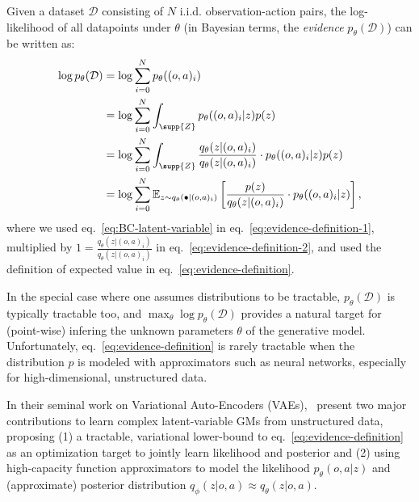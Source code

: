 Given a dataset \( \mathcal D \) consisting of \( N \) i.i.d. observation-action pairs, the log-likelihood of all datapoints under \( \theta \) (in Bayesian terms, the \emph{evidence} \( p_\theta(\mathcal D)\)) can be written as:
\begin{align}
    \log p_\theta(\mathcal D) &= \log \sum_{i=0}^N p_\theta ((o,a)_i) \label{eq:evidence-definition-1}\\
                              &= \log \sum_{i=0}^N \int_{\supp{Z}} p_\theta((o,a)_i \vert z) p(z) \label{eq:evidence-definition-2}\\
                              &= \log \sum_{i=0}^N \int_{\supp{Z}} \frac{q_\theta(z \vert (o,a)_i)}{q_\theta(z \vert (o,a)_i)} \cdot p_\theta((o,a)_i \vert z) p(z) \label{eq:evidence-definition-3}\\
                              &= \log \sum_{i=0}^N \mathbb E_{z \sim q_\theta(\bullet \vert (o,a)_i)} \left[ \frac{p(z)}{q_\theta(z \vert (o,a)_i)} \cdot p_\theta((o,a)_i \vert z) \right], \label{eq:evidence-definition}
\end{align}
where we used eq.~\ref{eq:BC-latent-variable} in eq.~\ref{eq:evidence-definition-1}, multiplied by \(1 = \frac{q_\theta(z \vert (o,a)_i)}{q_\theta(z \vert (o,a)_i)} \) in eq.~\ref{eq:evidence-definition-2}, and used the definition of expected value in eq.~\ref{eq:evidence-definition}.

In the special case where one assumes distributions to be tractable, \( p_\theta (\mathcal D) \) is typically tractable too, and \(\max_\theta \log p_\theta(\mathcal D) \) provides a natural target for (point-wise) infering the unknown parameters \( \theta \) of the generative model.
Unfortunately, eq.~\ref{eq:evidence-definition} is rarely tractable when the distribution \( p \) is modeled with approximators such as neural networks, especially for high-dimensional, unstructured data.

In their seminal work on Variational Auto-Encoders (VAEs),~\citet{kingma2013auto} present two major contributions to learn complex latent-variable GMs from unstructured data, proposing (1) a tractable, variational lower-bound to eq.~\ref{eq:evidence-definition} as an optimization target to jointly learn likelihood and posterior and (2) using high-capacity function approximators to model the likelihood \(p_\theta(o,a\vert z)\) and (approximate) posterior distribution \( q_\phi(z \vert o,a) \approx q_\theta(z \vert o,a) \).

